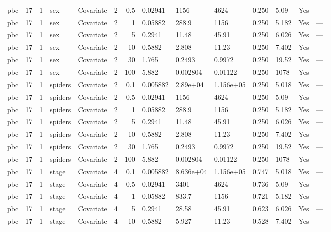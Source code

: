 \begin{tabular}{lrlllrrlllllll}
  pbc & 17 & 1 & sex & Covariate & 2 &   0.5 & 0.02941 & 1156 & 4624 & 0.250 & 5.09 & Yes & --- \\ 
  pbc & 17 & 1 & sex & Covariate & 2 &     1 & 0.05882 & 288.9 & 1156 & 0.250 & 5.182 & Yes & --- \\ 
  pbc & 17 & 1 & sex & Covariate & 2 &     5 & 0.2941 & 11.48 & 45.91 & 0.250 & 6.026 & Yes & --- \\ 
  pbc & 17 & 1 & sex & Covariate & 2 &    10 & 0.5882 & 2.808 & 11.23 & 0.250 & 7.402 & Yes & --- \\ 
  pbc & 17 & 1 & sex & Covariate & 2 &    30 & 1.765 & 0.2493 & 0.9972 & 0.250 & 19.52 & Yes & --- \\ 
  pbc & 17 & 1 & sex & Covariate & 2 &   100 & 5.882 & 0.002804 & 0.01122 & 0.250 & 1078 & Yes & --- \\ 
  pbc & 17 & 1 & spiders & Covariate & 2 &   0.1 & 0.005882 & 2.89e+04 & 1.156e+05 & 0.250 & 5.018 & Yes & --- \\ 
  pbc & 17 & 1 & spiders & Covariate & 2 &   0.5 & 0.02941 & 1156 & 4624 & 0.250 & 5.09 & Yes & --- \\ 
  pbc & 17 & 1 & spiders & Covariate & 2 &     1 & 0.05882 & 288.9 & 1156 & 0.250 & 5.182 & Yes & --- \\ 
  pbc & 17 & 1 & spiders & Covariate & 2 &     5 & 0.2941 & 11.48 & 45.91 & 0.250 & 6.026 & Yes & --- \\ 
  pbc & 17 & 1 & spiders & Covariate & 2 &    10 & 0.5882 & 2.808 & 11.23 & 0.250 & 7.402 & Yes & --- \\ 
  pbc & 17 & 1 & spiders & Covariate & 2 &    30 & 1.765 & 0.2493 & 0.9972 & 0.250 & 19.52 & Yes & --- \\ 
  pbc & 17 & 1 & spiders & Covariate & 2 &   100 & 5.882 & 0.002804 & 0.01122 & 0.250 & 1078 & Yes & --- \\ 
  pbc & 17 & 1 & stage & Covariate & 4 &   0.1 & 0.005882 & 8.636e+04 & 1.156e+05 & 0.747 & 5.018 & Yes & --- \\ 
  pbc & 17 & 1 & stage & Covariate & 4 &   0.5 & 0.02941 & 3401 & 4624 & 0.736 & 5.09 & Yes & --- \\ 
  pbc & 17 & 1 & stage & Covariate & 4 &     1 & 0.05882 & 833.7 & 1156 & 0.721 & 5.182 & Yes & --- \\ 
  pbc & 17 & 1 & stage & Covariate & 4 &     5 & 0.2941 & 28.58 & 45.91 & 0.623 & 6.026 & Yes & --- \\ 
  pbc & 17 & 1 & stage & Covariate & 4 &    10 & 0.5882 & 5.927 & 11.23 & 0.528 & 7.402 & Yes & --- \\ 

\end{tabular}

